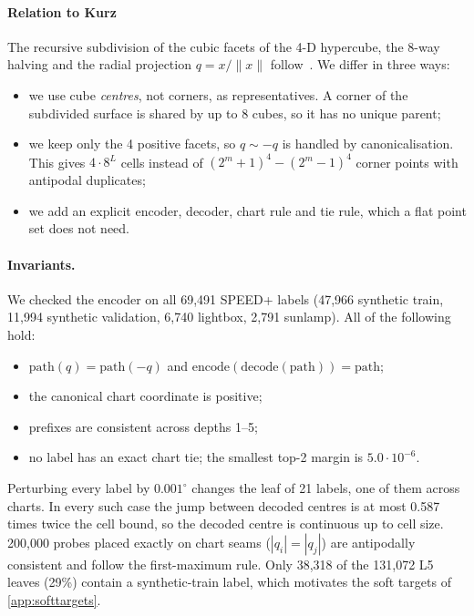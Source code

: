 \paragraph{Relation to Kurz \etal}
The recursive subdivision of the cubic facets of the 4-D hypercube, the 8-way halving and the radial projection $q=x/\|x\|$ follow~\cite{kurz2017tesseract}. We differ in three ways:
\begin{itemize}
  \item we use cube \emph{centres}, not corners, as representatives. A corner of the subdivided surface is shared by up to 8 cubes, so it has no unique parent;
  \item we keep only the 4 positive facets, so $q\sim-q$ is handled by canonicalisation. This gives $4\cdot8^L$ cells instead of $(2^m{+}1)^4-(2^m{-}1)^4$ corner points with antipodal duplicates;
  \item we add an explicit encoder, decoder, chart rule and tie rule, which a flat point set does not need.
\end{itemize}

\paragraph{Invariants.}
We checked the encoder on all 69,491 SPEED+ labels (47,966 synthetic train, 11,994 synthetic validation, 6,740 lightbox, 2,791 sunlamp). All of the following hold:
\begin{itemize}
  \item $\mathrm{path}(q)=\mathrm{path}(-q)$ and $\mathrm{encode}(\mathrm{decode}(\mathrm{path}))=\mathrm{path}$;
  \item the canonical chart coordinate is positive;
  \item prefixes are consistent across depths 1--5;
  \item no label has an exact chart tie; the smallest top-2 margin is $5.0\cdot10^{-6}$.
\end{itemize}
Perturbing every label by $0.001^\circ$ changes the leaf of 21 labels, one of them across charts. In every such case the jump between decoded centres is at most 0.587 times twice the cell bound, so the decoded centre is continuous up to cell size. 200,000 probes placed exactly on chart seams ($|q_i|=|q_j|$) are antipodally consistent and follow the first-maximum rule. Only 38,318 of the 131,072 L5 leaves (29\%) contain a synthetic-train label, which motivates the soft targets of \cref{app:softtargets}.

